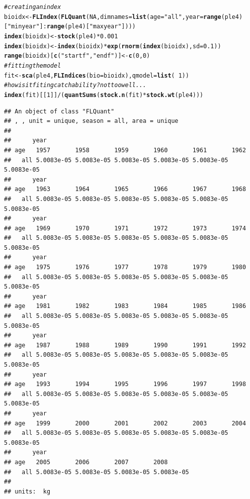 \documentclass[a4paper,english,10pt]{article}\usepackage[]{graphicx}\usepackage[]{color}
\makeatletter
\newcommand{\hlnum}[1]{\textcolor[rgb]{0.686,0.059,0.569}{#1}}%
\newcommand{\hlstr}[1]{\textcolor[rgb]{0.192,0.494,0.8}{#1}}%
\newcommand{\hlcom}[1]{\textcolor[rgb]{0.678,0.584,0.686}{\textit{#1}}}%
\newcommand{\hlopt}[1]{\textcolor[rgb]{0,0,0}{#1}}%
\newcommand{\hlstd}[1]{\textcolor[rgb]{0.345,0.345,0.345}{#1}}%
\newcommand{\hlkwb}[1]{\textcolor[rgb]{0.69,0.353,0.396}{#1}}%
\newcommand{\hlkwc}[1]{\textcolor[rgb]{0.333,0.667,0.333}{#1}}%
\newcommand{\hlkwd}[1]{\textcolor[rgb]{0.737,0.353,0.396}{\textbf{#1}}}%
\newenvironment{kframe}{%
 \def\at@end@of@kframe{}%
 \ifinner\ifhmode%
  \def\at@end@of@kframe{\end{minipage}}%
  \begin{minipage}{\columnwidth}%
 \fi\fi%
 \def\FrameCommand##1{\hskip\@totalleftmargin \hskip-\fboxsep
 \colorbox{shadecolor}{##1}\hskip-\fboxsep
     \hskip-\linewidth \hskip-\@totalleftmargin \hskip\columnwidth}%
 \MakeFramed {\advance\hsize-\width
   \@totalleftmargin\z@ \linewidth\hsize
   \@setminipage}}%
 {\par\unskip\endMakeFramed%
 \at@end@of@kframe}
\newenvironment{knitrout}{}{} %
\makeatother
\begin{document}
\begin{knitrout}
\color{fgcolor}\begin{kframe}
\begin{alltt}
\hlcom{# creating an index}
\hlstd{bioidx} \hlkwb{<-} \hlkwd{FLIndex}\hlstd{(}\hlkwd{FLQuant}\hlstd{(}\hlnum{NA}\hlstd{,} \hlkwc{dimnames} \hlstd{=} \hlkwd{list}\hlstd{(}\hlkwc{age} \hlstd{=} \hlstr{"all"}\hlstd{,} \hlkwc{year} \hlstd{=} \hlkwd{range}\hlstd{(ple4)[}\hlstr{"minyear"}\hlstd{]}\hlopt{:}\hlkwd{range}\hlstd{(ple4)[}\hlstr{"maxyear"}\hlstd{])))}
\hlkwd{index}\hlstd{(bioidx)} \hlkwb{<-} \hlkwd{stock}\hlstd{(ple4)} \hlopt{*} \hlnum{0.001}
\hlkwd{index}\hlstd{(bioidx)} \hlkwb{<-} \hlkwd{index}\hlstd{(bioidx)} \hlopt{*} \hlkwd{exp}\hlstd{(}\hlkwd{rnorm}\hlstd{(}\hlkwd{index}\hlstd{(bioidx),} \hlkwc{sd} \hlstd{=} \hlnum{0.1}\hlstd{))}
\hlkwd{range}\hlstd{(bioidx)[}\hlkwd{c}\hlstd{(}\hlstr{"startf"}\hlstd{,} \hlstr{"endf"}\hlstd{)]} \hlkwb{<-} \hlkwd{c}\hlstd{(}\hlnum{0}\hlstd{,} \hlnum{0}\hlstd{)}
\hlcom{# fitting the model}
\hlstd{fit} \hlkwb{<-} \hlkwd{sca}\hlstd{(ple4,} \hlkwd{FLIndices}\hlstd{(}\hlkwc{bio} \hlstd{= bioidx),} \hlkwc{qmodel} \hlstd{=} \hlkwd{list}\hlstd{(}\hlopt{~}\hlnum{1}\hlstd{))}
\hlcom{# how is it fiting catchability ? not too well ...}
\hlkwd{index}\hlstd{(fit)[[}\hlnum{1}\hlstd{]]}\hlopt{/}\hlstd{(}\hlkwd{quantSums}\hlstd{(}\hlkwd{stock.n}\hlstd{(fit)} \hlopt{*} \hlkwd{stock.wt}\hlstd{(ple4)))}
\end{alltt}
\begin{verbatim}
## An object of class "FLQuant"
## , , unit = unique, season = all, area = unique
## 
##      year
## age   1957       1958       1959       1960       1961       1962      
##   all 5.0083e-05 5.0083e-05 5.0083e-05 5.0083e-05 5.0083e-05 5.0083e-05
##      year
## age   1963       1964       1965       1966       1967       1968      
##   all 5.0083e-05 5.0083e-05 5.0083e-05 5.0083e-05 5.0083e-05 5.0083e-05
##      year
## age   1969       1970       1971       1972       1973       1974      
##   all 5.0083e-05 5.0083e-05 5.0083e-05 5.0083e-05 5.0083e-05 5.0083e-05
##      year
## age   1975       1976       1977       1978       1979       1980      
##   all 5.0083e-05 5.0083e-05 5.0083e-05 5.0083e-05 5.0083e-05 5.0083e-05
##      year
## age   1981       1982       1983       1984       1985       1986      
##   all 5.0083e-05 5.0083e-05 5.0083e-05 5.0083e-05 5.0083e-05 5.0083e-05
##      year
## age   1987       1988       1989       1990       1991       1992      
##   all 5.0083e-05 5.0083e-05 5.0083e-05 5.0083e-05 5.0083e-05 5.0083e-05
##      year
## age   1993       1994       1995       1996       1997       1998      
##   all 5.0083e-05 5.0083e-05 5.0083e-05 5.0083e-05 5.0083e-05 5.0083e-05
##      year
## age   1999       2000       2001       2002       2003       2004      
##   all 5.0083e-05 5.0083e-05 5.0083e-05 5.0083e-05 5.0083e-05 5.0083e-05
##      year
## age   2005       2006       2007       2008      
##   all 5.0083e-05 5.0083e-05 5.0083e-05 5.0083e-05
## 
## units:  kg
\end{verbatim}
\end{kframe}
\end{knitrout}
\end{document}
